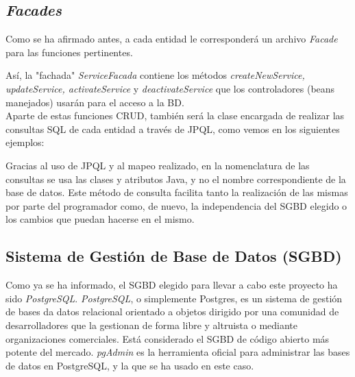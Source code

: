\subsection{\textit{Facades}}\label{subsec:facades}

Como se ha afirmado antes, a cada entidad le corresponderá un archivo \textit{Facade} para las funciones pertinentes. 



Así, la "fachada" \textit{ServiceFacada} contiene los métodos \textit{createNewService, updateService, activateService} y \textit{deactivateService} que los controladores (beans manejados) usarán para el acceso a la BD. \\

Aparte de estas funciones CRUD, también será la clase encargada de realizar las consultas SQL de cada entidad a través de JPQL, como vemos en los siguientes ejemplos: 





Gracias al uso de JPQL y al mapeo realizado, en la nomenclatura de las consultas se usa las clases y atributos Java, y no el nombre correspondiente de la base de datos. Este método de consulta facilita tanto la realización de las mismas por parte del programador como, de nuevo, la independencia del SGBD elegido o los cambios que puedan hacerse en el mismo. 


\subsection{Sistema de Gestión de Base de Datos (SGBD)}

Como ya se ha informado, el SGBD elegido para llevar a cabo este proyecto ha sido \textit{PostgreSQL}. \textit{PostgreSQL}, o simplemente Postgres, es un sistema de gestión de bases da datos relacional orientado a objetos dirigido por una comunidad de desarrolladores que la gestionan de forma libre y altruista o mediante organizaciones comerciales. Está considerado el SGBD de código abierto más potente del mercado. \textit{pgAdmin} es la herramienta oficial para administrar las bases de datos en PostgreSQL, y la que se ha usado en este caso. \\

